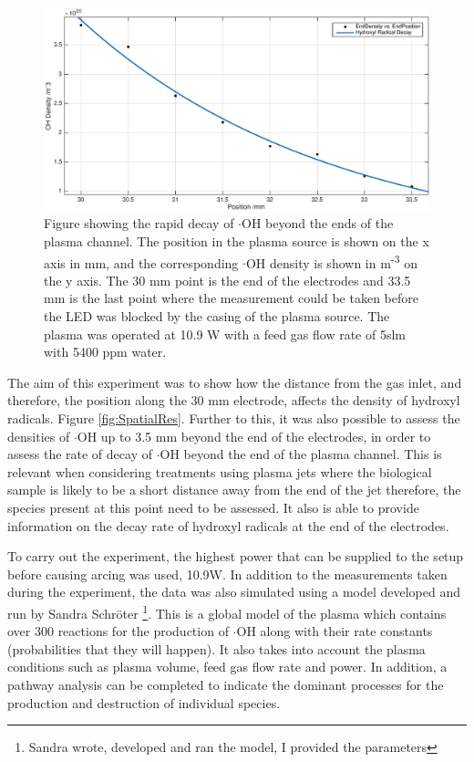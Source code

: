 \documentclass[11pt, oneside]{article}   	%
\begin{document}
\begin{figure}
	\centering
	\includegraphics[width=\textwidth]{Figures/OHdecay.eps}
	\caption{Figure showing the rapid decay of $\cdot$OH beyond the ends of the plasma channel. The position in the plasma source is shown on the x axis in mm, and the corresponding $\cdot$OH density is shown in m\textsuperscript{-3} on the y axis. The 30 mm point is the end of the electrodes and 33.5 mm is the last point where the measurement could be taken before the LED was blocked by the casing of the plasma source. The plasma was operated at 10.9 W with a feed gas flow rate of 5slm with 5400 ppm water.}
	\label{fig:OH decay}
\end{figure}

The aim of this experiment was to show how the distance from the gas inlet, and therefore, the position along the 30 mm electrode, affects the density of hydroxyl radicals. Figure \ref{fig:SpatialRes}.
Further to this, it was also possible to assess the densities of $\cdot$OH up to 3.5 mm beyond the end of the electrodes, in order to assess the rate of decay of $\cdot$OH beyond the end of the plasma channel.
This is relevant when considering treatments using plasma jets where the biological sample is likely to be a short distance away from the end of the jet therefore, the species present at this point need to be assessed.
It also is able to provide information on the decay rate of hydroxyl radicals at the end of the electrodes.

To carry out the experiment, the highest power that can be supplied to the setup before causing arcing was used, 10.9W.
In addition to the measurements taken during the experiment, the data was also simulated using a model developed and run by Sandra Schr\"{o}ter \footnote{Sandra wrote, developed and ran the model, I provided the parameters}.
This is a global model of the plasma which contains over 300 reactions for the production of $\cdot$OH along with their rate constants (probabilities that they will happen). It also takes into account the plasma conditions such as plasma volume, feed gas flow rate and power. In addition, a pathway analysis can be completed to indicate the dominant processes for the production and destruction of individual species.
\end{document}
